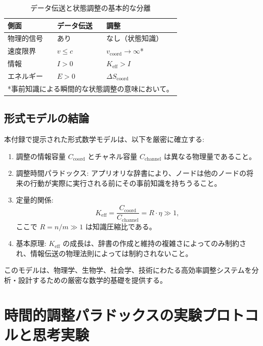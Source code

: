 \documentclass[12pt,a4paper]{ltjsarticle}
\begin{document}
	\begin{table}[htbp]
		\centering
		\caption{データ伝送と状態調整の基本的な分離}
		\label{tab:separation}
		\begin{tabular}{lp{6cm}p{6cm}}
			\toprule
			\textbf{側面} & \textbf{データ伝送} & \textbf{調整} \\
			\midrule
			物理的信号 & あり & なし（状態知識） \\
			速度限界 & $v \leq c$ & $v_{\text{coord}} \to \infty$* \\
			情報 & $I > 0$ & $K_{\text{eff}} > I$ \\
			エネルギー & $E > 0$ & $\Delta S_{\text{coord}}$ \\
			\bottomrule
			\multicolumn{3}{l}{*事前知識による瞬間的な状態調整の意味において。}
		\end{tabular}
	\end{table}
	
	\subsection{形式モデルの結論}
	
	本付録で提示された形式数学モデルは、以下を厳密に確立する:
	
	\begin{enumerate}
		\item 調整の情報容量 $C_{\text{coord}}$ とチャネル容量 $C_{\text{channel}}$ は異なる物理量であること。
		
		\item 調整時間パラドックス: アプリオリな辞書により、ノードは他のノードの将来の行動が実際に実行される前にその事前知識を持ちうること。
		
		\item 定量的関係:
		\[
		K_{\mathrm{eff}} = \frac{C_{\text{coord}}}{C_{\text{channel}}} = R \cdot \eta \gg 1,
		\]
		ここで $R = n/m \gg 1$ は知識圧縮比である。
		
		\item 基本原理: $K_{\mathrm{eff}}$ の成長は、辞書の作成と維持の複雑さによってのみ制約され、情報伝送の物理法則によっては制約されないこと。
	\end{enumerate}
	
	このモデルは、物理学、生物学、社会学、技術にわたる高効率調整システムを分析・設計するための厳密な数学的基礎を提供する。
	
	
	\section{時間的調整パラドックスの実験プロトコルと思考実験}
	\label{app:experimental-protocols}
	
\end{document}
